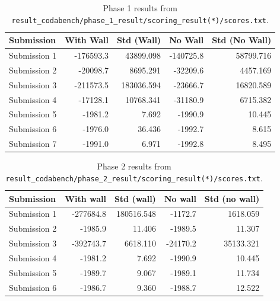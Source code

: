 \documentclass[11pt,oneside]{article}
\renewcommand{\arraystretch}{1.1}
\begin{document}
\begin{table}[h]
\centering
\small
\setlength{\tabcolsep}{6pt} %
\renewcommand{\arraystretch}{1.2} %

\caption{Phase 1 results from \texttt{result\_codabench/phase\_1\_result/scoring\_result(*)/scores.txt}.}
\label{tab:phase1results}

\begin{tabular}{l r r r r}
\toprule
\textbf{Submission} & \textbf{With Wall} & \textbf{Std (Wall)} & \textbf{No Wall} & \textbf{Std (No Wall)} \\
\midrule
Submission 1 & -176593.3 & 43899.098 & -140725.8 & 58799.716 \\
Submission 2 & -20098.7 & 8695.291 & -32209.6 & 4457.169 \\
Submission 3 & -211573.5 & 183036.594 & -23666.7 & 16820.589 \\
Submission 4 & -17128.1 & 10768.341 & -31180.9 & 6715.382 \\
Submission 5 & -1981.2 & 7.692 & -1990.9 & 10.445 \\
Submission 6 & -1976.0 & 36.436 & -1992.7 & 8.615 \\
Submission 7 & -1991.0 & 6.971 & -1992.8 & 8.495 \\
\bottomrule
\end{tabular}
\end{table}

\begin{table}[h]
\centering
\small
\caption{Phase 2 results from \texttt{result\_codabench/phase\_2\_result/scoring\_result(*)/scores.txt}.}
\label{tab:phase2results}
\begin{tabular}{lrrrr}
\toprule
Submission & With wall & Std (wall) & No wall & Std (no wall) \\
\midrule
Submission 1 & -277684.8 & 180516.548 & -1172.7 & 1618.059 \\
Submission 2 & -1985.9 & 11.406 & -1989.5 & 11.307 \\
Submission 3 & -392743.7 & 6618.110 & -24170.2 & 35133.321 \\
Submission 4 & -1981.2 & 7.692 & -1990.9 & 10.445 \\
Submission 5 & -1989.7 & 9.067 & -1989.1 & 11.734 \\
Submission 6 & -1986.7 & 9.360 & -1988.7 & 12.522 \\
\bottomrule
\end{tabular}
\end{table}
\end{document}
